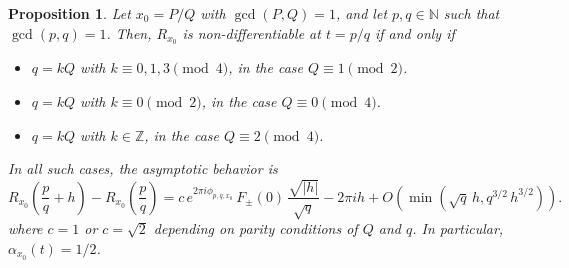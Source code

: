\documentclass[11pt,reqno]{amsart}
\newtheorem{prop}[thm]{Proposition}
\theoremstyle{definition}
\begin{document}
\begin{prop}\label{thm:Non-differentiability_Rationals}
Let $x_0 = P/Q$ with $\operatorname{gcd}(P,Q) = 1$, and let $p,q \in \mathbb N$ such that $\operatorname{gcd}(p,q) = 1$. 
Then, $R_{x_0}$ is non-differentiable at $t = p/q$ if and only if
\begin{itemize}
	\item $q = kQ$ with $k \equiv 0,1,3 \pmod{4}$, in the case $Q \equiv 1 \pmod{2}$.
	\item $q = kQ$ with $k \equiv 0 \pmod{2}$, in the case $Q \equiv 0 \pmod{4}$.
	\item $q = kQ$ with $k \in \mathbb Z$,  in the case $Q \equiv 2 \pmod{4}$.
\end{itemize} 
In all such cases, the asymptotic behavior is 
\begin{equation}\label{eq:Asymptotic_Nondifferentiable}
	R_{x_0}\left( \frac{p}{q} + h  \right)  - R_{x_0}\left( \frac{p}{q} \right) 
 =    c \, e^{2\pi i \phi_{p,q,x_0}} \, F_\pm(0) \, \frac{\sqrt{|h|}}{\sqrt{q}} - 2\pi i h +  O\left( \min \left( \sqrt{q} \, h , q^{3/2}\, h^{3/2}  \right) \right).   
	\end{equation}
	where $c=1$ or $c = \sqrt{2}$ depending on parity conditions of $Q$ and $q$. 
	In particular, $\alpha_{x_0}(t) = 1/2$.
\end{prop}
\end{document}
